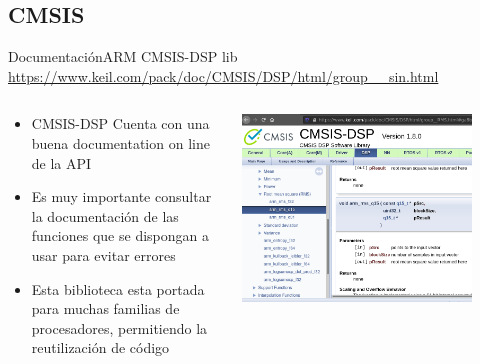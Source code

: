  \subsection{CMSIS}
 \begin{frame}[t]{Documentación}{ARM CMSIS-DSP lib \tiny
    \href{https://www.keil.com/pack/doc/CMSIS/DSP/html/group\_\_sin.html}{https://www.keil.com/pack/doc/CMSIS/DSP/html/group\_\_sin.html}
    }
    \footnotesize
    \begin{columns}[t]
       \hspace{2pt}
       \begin{column}[c]{.4\textwidth}
    \begin{itemize}
       \item{CMSIS-DSP Cuenta con una buena documentation on line de la API}
       \item{Es muy importante consultar la documentación de las funciones que se dispongan a usar para evitar errores}
       \item{Esta biblioteca esta portada para muchas familias de procesadores, permitiendo la reutilización de código}
    \end{itemize}
       \end{column}
       \hspace{2pt}
       \vrule
       \hspace{2pt}
       \begin{column}[c]{.6\textwidth}
          \center\includegraphics[width=0.85\textwidth]{2_clase/cmsis_page}
       \end{column}
       \hspace{2pt}
    \end{columns}
 \end{frame}
